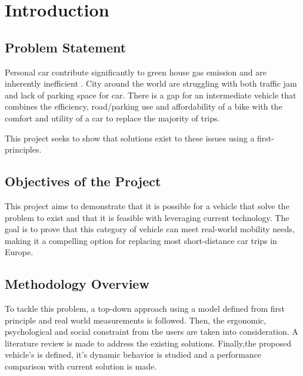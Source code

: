 \section{Introduction}

\subsection{Problem Statement}

Personal car contribute significantly to green house gas emission and are inherently inefficient \cite{us_epa_carbon_2015}. 
City around the world are struggling with both traffic jam and lack of parking space for car.
There is a gap for an intermediate vehicle that combines the efficiency, road/parking use and affordability of a bike with the comfort and utility of a car to replace the majority of trips.

 This project seeks to show that solutions exist to these issues using a first-principles.

\subsection{Objectives of the Project}

This project aims to demonstrate that it is possible for a vehicle that solve the problem to exist and that it is feasible with leveraging current technology. The goal is to prove that this category of vehicle can meet real-world mobility needs, making it a compelling option for replacing most short-distance car trips in Europe.

\subsection{Methodology Overview}

To tackle this problem, a top-down approach using a model defined from first principle and real world measurements is followed. Then, the ergonomic, psychological and social constraint from the users are taken into consideration. A literature review is made to address the existing solutions. Finally,the proposed vehicle's is defined, it's dynamic behavior is studied and a performance comparison with current solution is made.